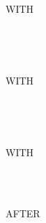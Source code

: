 \begin{0-1}
  WITH  
  \begin{0-1}
    \identifier \\
    \integer
  \end{0-1}
  \begin{1=}
     \\
  \end{1=}
\end{0-1}

\begin{0-1}
  WITH  
  \begin{0-1}
    \identifier \\
    \integer
  \end{0-1}
  \begin{1=}
     \\
  \end{1=}
\end{0-1}

\begin{0-1}
  WITH
  \begin{1=}
     \\
     \\
  \end{1=}
  AFTER
  \begin{0-1}
    \identifier \\
    \integer
  \end{0-1}
\end{0-1}

  
 \identifier {}
\begin{1=}
  \begin{0-1}
  \end{0-1} \\

  \begin{0-1}
  \end{0-1} \\

   \\
   \\
\end{1=}

